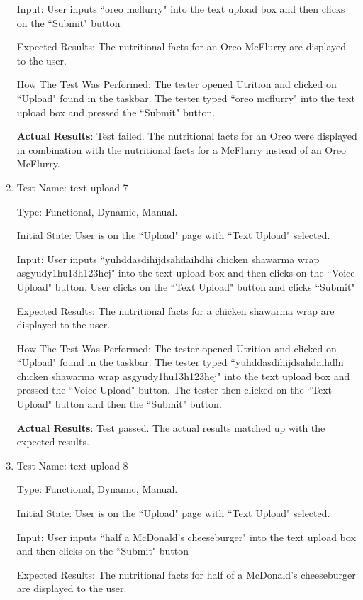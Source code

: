 \documentclass[12pt, titlepage]{article}
\begin{document}
\begin{enumerate}
		Input: User inputs ``oreo mcflurry" into the text upload box and then clicks on the ``Submit" button
		
		Expected Results: The nutritional facts for an Oreo McFlurry are displayed to the user.
		
		How The Test Was Performed: The tester opened Utrition and clicked on ``Upload" found in the taskbar. The tester typed ``oreo mcflurry" into the text upload box and pressed the ``Submit" button.
		
		\textbf{Actual Results}: Test failed. The nutritional facts for an Oreo were displayed in combination with the nutritional facts for a McFlurry instead of an Oreo McFlurry.
		
		\item{Test Name: text-upload-7}
		
		Type: Functional, Dynamic, Manual.
		
		Initial State: User is on the ``Upload" page with ``Text Upload" selected.
		
		Input: User inputs ``yuhddasdihijdsahdaihdhi chicken shawarma wrap asgyudy1hu13h123hej" into the text upload box and then clicks on the ``Voice Upload" button. User clicks on the ``Text Upload" button and clicks ``Submit"
		
		Expected Results: The nutritional facts for a chicken shawarma wrap are displayed to the user.
		
		How The Test Was Performed: The tester opened Utrition and clicked on ``Upload" found in the taskbar. The tester typed ``yuhddasdihijdsahdaihdhi chicken shawarma wrap asgyudy1hu13h123hej" into the text upload box and pressed the ``Voice Upload" button. The tester then clicked on the ``Text Upload" button and then the ``Submit" button.
		
		\textbf{Actual Results}: Test passed. The actual results matched up with the expected results.
		
		\item{Test Name: text-upload-8}
		
		Type: Functional, Dynamic, Manual.
		
		Initial State: User is on the ``Upload" page with ``Text Upload" selected.
		
		Input: User inputs ``half a McDonald's cheeseburger" into the text upload box and then clicks on the ``Submit" button
		
		Expected Results: The nutritional facts for half of a McDonald's cheeseburger are displayed to the user.
		

\end{enumerate}
\end{document}
